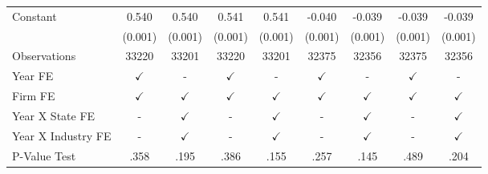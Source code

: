 {\begin{tabular}{l*{8}{c}}
Constant            &       0.540\sym{***}&       0.540\sym{***}&       0.541\sym{***}&       0.541\sym{***}&      -0.040\sym{***}&      -0.039\sym{***}&      -0.039\sym{***}&      -0.039\sym{***}\\
                    &     (0.001)         &     (0.001)         &     (0.001)         &     (0.001)         &     (0.001)         &     (0.001)         &     (0.001)         &     (0.001)         \\
\midrule
Observations        &       33220         &       33201         &       33220         &       33201         &       32375         &       32356         &       32375         &       32356         \\
Year FE             &$\checkmark$         &           -         &$\checkmark$         &           -         &$\checkmark$         &           -         &$\checkmark$         &           -         \\
Firm FE             &$\checkmark$         &$\checkmark$         &$\checkmark$         &$\checkmark$         &$\checkmark$         &$\checkmark$         &$\checkmark$         &$\checkmark$         \\
Year X State FE     &           -         &$\checkmark$         &           -         &$\checkmark$         &           -         &$\checkmark$         &           -         &$\checkmark$         \\
Year X Industry FE  &           -         &$\checkmark$         &           -         &$\checkmark$         &           -         &$\checkmark$         &           -         &$\checkmark$         \\
P-Value Test        &        .358         &        .195         &        .386         &        .155         &        .257         &        .145         &        .489         &        .204         \\
\bottomrule
\end{tabular}
}
